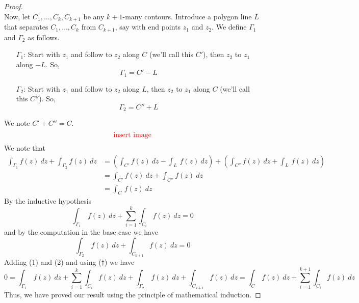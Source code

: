 \begin{proof}
\\
Now, let $C_1,\ldots,C_k,C_{k+1}$ be any $k+1$-many contours. Introduce a polygon line $L$ that separates $C_1,\ldots,C_k$ from $C_{k+1}$, say with end points $z_1$ and $z_2$. We define $\Gamma_1$ and $\Gamma_2$ as follows.
\begin{itemize}
\item[$\Gamma_1$:] Start with $z_1$ and follow to $z_2$ along $C$ (we'll call this $C'$), then $z_2$ to $z_1$ along $-L$. So, 
\[\Gamma_1 = C' - L\]
\item[$\Gamma_2$:] Start with $z_1$ and follow to $z_2$ along $L$, then $z_2$ to $z_1$ along $C$ (we'll call this $C''$). So, 
\[\Gamma_2 = C'' + L\]
\end{itemize}
We note $C' + C'' = C$.
\[\text{\color{red}insert image}\]
\vfill
We note that
\begin{align*}
\int_{\Gamma_1}f(z)\ dz + \int_{\Gamma_2}f(z)\ dz &= \left(\int_{C'}f(z)\ dz - \int_{L}\,f(z)\ dz\right) + \left(\int_{C''}f(z)\ dz + \int_{L}\,f(z)\ dz\right)\\[1em]
 &= \int_{C'}f(z)\ dz + \int_{C''}f(z)\ dz\\[1em]
 &= \int_C\,f(z)\ dz \tag{$\dagger$}
\end{align*}
By the inductive hypothesis
\[\int_{\Gamma_1}\,f(z)\ dz + \sum_{i=1}^k\int_{C_i}f(z)\ dz = 0\tag{1}\]
and by the computation in the base case we have
\[\int_{\Gamma_2}\,f(z)\ dz + \int_{C_{k+1}}f(z)\ dz = 0\tag{2}\]
Adding (1) and (2) and using ($\dagger$) we have
\[0 = \int_{\Gamma_1}\,f(z)\ dz + \sum_{i=1}^k\int_{C_i}f(z)\ dz + \int_{\Gamma_2}\,f(z)\ dz + \int_{C_{k+1}}f(z)\ dz = \int_C\,f(z)\ dz + \sum_{i=1}^{k+1}\int_{C_i}f(z)\ dz\]
Thus, we have proved our result using the principle of mathematical induction. 
\end{proof}

\medskip

